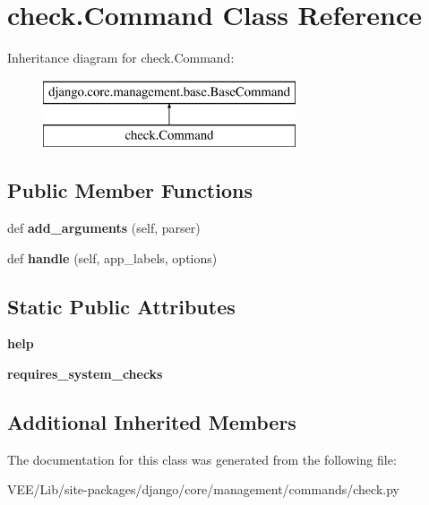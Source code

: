 \hypertarget{classcheck_1_1_command}{}\section{check.\+Command Class Reference}
\label{classcheck_1_1_command}
Inheritance diagram for check.\+Command\+:\begin{figure}[H]
\begin{center}
\leavevmode
\includegraphics[height=2.000000cm]{classcheck_1_1_command}
\end{center}
\end{figure}
\subsection*{Public Member Functions}
\begin{DoxyCompactItemize}
\item 
\mbox{\label{classcheck_1_1_command_adea2eab2e4aaf8913f6dbf42921dc1ca}} 
def {\bfseries add\+\_\+arguments} (self, parser)
\item 
\mbox{\label{classcheck_1_1_command_aaeec4f54e43deb3f11330f9ea5c11594}} 
def {\bfseries handle} (self, app\+\_\+labels, options)
\end{DoxyCompactItemize}
\subsection*{Static Public Attributes}
\begin{DoxyCompactItemize}
\item 
\mbox{\label{classcheck_1_1_command_a86e5311923441555a68131cd4d780edd}} 
{\bfseries help}
\item 
\mbox{\label{classcheck_1_1_command_a13b22f5a161c6bed8c5ee0290b6dd08f}} 
{\bfseries requires\+\_\+system\+\_\+checks}
\end{DoxyCompactItemize}
\subsection*{Additional Inherited Members}


The documentation for this class was generated from the following file\+:\begin{DoxyCompactItemize}
\item 
V\+E\+E/\+Lib/site-\/packages/django/core/management/commands/check.\+py\end{DoxyCompactItemize}
